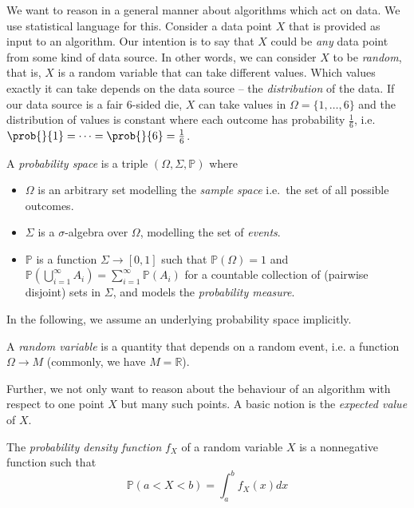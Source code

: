 \documentclass[
	twoside=false, %
]{kaobook}
\begin{document}
We want to reason in a general manner about algorithms which act on data. We use statistical language for this. Consider a data point $X$ that is provided as input to an algorithm. Our intention is to say that $X$ could be \textit{any} data point from some kind of data source. In other words, we can consider $X$ to be \textit{random}, that is, $X$ is a random variable that can take different values. 
Which values exactly it can take depends on the data source -- the \textit{distribution} of the data. If our data source is a fair $6$-sided die, $X$ can take values in $\Omega = \{ 1, \dots, 6 \}$ and the distribution of values is constant where each outcome has probability $\frac{1}{6}$, i.e. $\prob{}{1} = \dots  = \prob{}{6} = \frac{1}{6}$.
\begin{definition}
  A \textit{probability space} is a triple \((\Omega, \Sigma, \mathbb{P})\)
  where
  \begin{itemize}
  \item \(\Omega\) is an arbitrary set modelling the \textit{sample space}
    i.e.~the set of all possible outcomes.
  \item \(\Sigma\) is a \(\sigma\)-algebra
    over \(\Omega\), modelling the set of \textit{events}.
    \item \(\mathbb{P}\) is a function
    \(\Sigma \to [0,1]\) such that \(\mathbb{P}(\Omega)=1\) and
    \(\mathbb{P}\left( \bigcup_{i=1}^\infty A_{i} \right) = \sum_{i=1}^\infty
    \mathbb{P}(A_{i})\) for a countable collection of (pairwise disjoint) sets
    in \(\Sigma\), and models the \textit{probability measure}.
  \end{itemize}
\end{definition}
In the following, we assume an underlying probability space implicitly.
\begin{definition}
  A \textit{random variable} is a quantity
  that depends on a random event, i.e. a function \(\Omega
  \to M\) (commonly, we have \(M=\mathbb{R}\)).
\end{definition}
Further, we not only want to reason about the behaviour of an algorithm with respect to one point $X$ but many such points. A basic notion is the \textit{expected value} of $X$. 
\begin{definition}
  The \textit{probability density function} $f_X$ of a random variable $X$ is a
  nonnegative function such that
  $$
  \mathbb{P}(a < X < b) = \int_a^b f_X(x) dx
  $$
\end{definition} 
\end{document}
